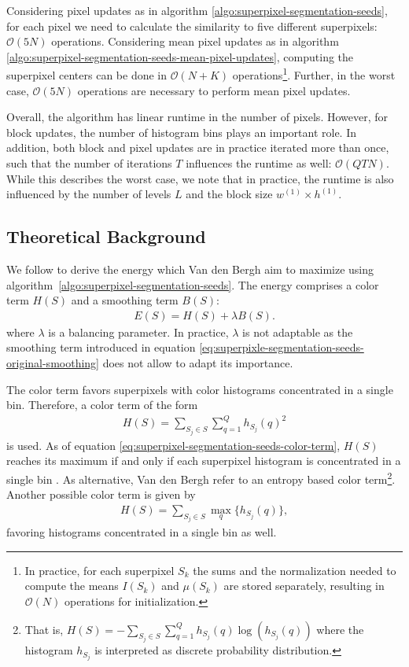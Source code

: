 Considering pixel updates as in algorithm \ref{algo:superpixel-segmentation-seeds}, for each pixel we need to calculate the similarity to five different superpixels: $\mathcal{O}(5N)$ operations. Considering mean pixel updates as in algorithm \ref{algo:superpixel-segmentation-seeds-mean-pixel-updates}, computing the superpixel centers can be done in $\mathcal{O}(N + K)$ operations\footnote{In practice, for each superpixel $S_k$ the sums and the normalization needed to compute the means $I(S_k)$ and $\mu(S_k)$ are stored separately, resulting in $\mathcal{O}(N)$ operations for initialization.}. Further, in the worst case, $\mathcal{O}(5N)$ operations are necessary to perform mean pixel updates.

Overall, the algorithm has linear runtime in the number of pixels. However, for block updates, the number of histogram bins plays an important role. In addition, both block and pixel updates are in practice iterated more than once, such that the number of iterations $T$ influences the runtime as well: $\mathcal{O}(QTN)$. While this describes the worst case, we note that in practice, the runtime is also influenced by the number of levels $L$ and the block size $w^{(1)} \times h^{(1)}$.

\subsection{Theoretical Background}

We follow \cite{VanDenBerghBoixRoigCapitaniVanGool:2012} to derive the energy which Van den Bergh \etal aim to maximize using algorithm~\ref{algo:superpixel-segmentation-seeds}. The energy comprises a color term $H(S)$ and a smoothing term $B(S)$:
\begin{align}
	\label{eq:superpixel-segmentation-seeds-objective-function}
	E(S) = H(S) + \lambda B(S).
\end{align}
where $\lambda$ is a balancing parameter. In practice, $\lambda$ is not adaptable as the smoothing term introduced in equation \eqref{eq:superpixle-segmentation-seeds-original-smoothing} does not allow to adapt its importance.

The color term favors superpixels with color histograms concentrated in a single bin. Therefore, a color term of the form
\begin{align}
	\label{eq:superpixel-segmentation-seeds-color-term}
	H(S) = \sum_{S_j \in S} \sum_{q = 1} ^Q h_{S_j}(q)^2
\end{align}
is used. As of equation \eqref{eq:superpixel-segmentation-seeds-color-term}, $H(S)$ reaches its maximum if and only if each superpixel histogram is concentrated in a single bin \cite{VanDenBerghBoixRoigCapitaniVanGool:2012}. As alternative, Van den Bergh \etal refer to an entropy based color term\footnote{That is, $H(S) = - \sum_{S_j \in S} \sum_{q = 1} ^Q h_{S_j}(q) \log(h_{S_j}(q))$ where the histogram $h_{S_j}$ is interpreted as discrete probability distribution.}. Another possible color term is given by
\begin{align}
	H(S) = \sum_{S_j \in S} \max_q \{h_{S_j}(q)\},
\end{align}
favoring histograms concentrated in a single bin as well.

